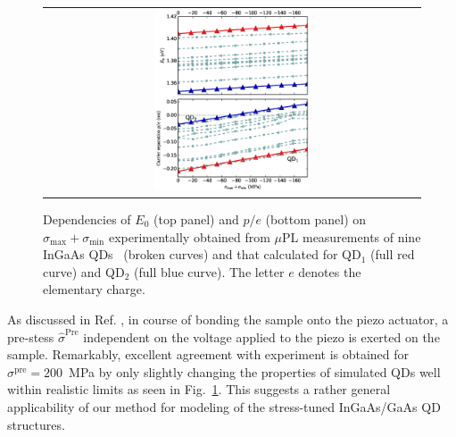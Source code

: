 \documentclass[aps,prl,amsmath,amssymb,twocolumn,showpacs,showkeys,superscriptaddress]{revtex4-1}
\begin{document}
\begin{figure}[!ht]
\renewcommand{\tabcolsep}{2pt}
\begin{center}
\begin{tabular}{c}
\includegraphics[width=0.42\textwidth]{2018-02-04__171219_8x8_neotocena_++_nn+_35deg_pres500___theoryVSexperiment.eps} \\
\end{tabular}
\end{center}
\caption{
Dependencies of $E_0$ (top panel) and $p/e$ (bottom panel) on $\sigma_{\mathrm{max}}+\sigma_{\mathrm{min}}$ experimentally obtained from $\mu$PL measurements of nine InGaAs QDs~\cite{Aberl:17} (broken curves) and that calculated for QD$_1$ (full red curve) and QD$_2$ (full blue curve). The letter $e$ denotes the elementary charge.
%
\label{fig:TheorVsExp}}
\end{figure}


As discussed in Ref. \cite{Aberl:17}, in course of bonding the sample onto the piezo actuator, a pre-stess $\hat\sigma^\text{Pre}$ independent on the voltage applied to the piezo is exerted on the sample. Remarkably, excellent agreement with experiment is obtained for $\sigma^{\mathrm{pre}}=200$~MPa by only slightly changing the properties of simulated QDs well within realistic limits as seen in Fig.~\ref{fig:TheorVsExp}. This suggests a rather general applicability of our method for modeling of the stress-tuned InGaAs/GaAs QD structures.
\end{document}
